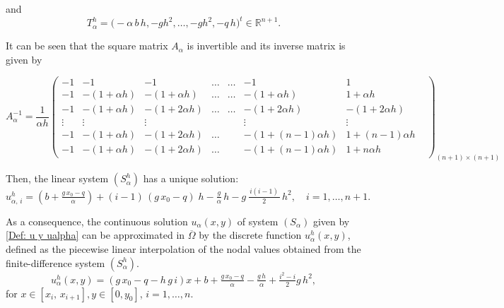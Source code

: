 \documentclass[11pt]{article}
\begin{document}
  \noindent and \begin{equation}\label{Talpha}
  {T^h_\alpha}= \Big(-\alpha\,b\,h, -g h^2, \ldots, -g h^2, -q\,h  \Big)^t \in  \mathbb{R}^{n+1}.
  \end{equation}
     
 \noindent It can be seen that the square matrix $A_{\alpha}$ is invertible  and its inverse matrix is given by
 
 
\begin{scriptsize}
\[A_{\alpha}^{-1}=\frac{1}{\alpha h}\begin{pmatrix}
-1 & -1 & -1 & \ldots & \ldots & -1 & 1 &\\                                                                                                   
-1 & -(1+\alpha h) & -(1+\alpha h) & \ldots & \ldots & -(1+\alpha h) & 1+\alpha h &\\                                                                                                   
-1 & -(1+\alpha h) & -(1+2\alpha h) & \ldots & \ldots &-(1+2\alpha h) & -(1+2\alpha h) &\\                                                                                                   
\vdots & \vdots & \vdots  &&& \vdots  & \vdots\\
-1& -(1+\alpha h)& -(1+2\alpha h) &\ldots && -(1+(n-1)\alpha h) & 1+(n-1)\alpha h\\
 -1 & -(1+\alpha h)& -(1+2\alpha h)& \ldots &  &-(1+(n-1)\alpha h) &1+n\alpha h
\end{pmatrix}_{(n+1)\times (n+1)}\] 
\end{scriptsize}
 
 
 
Then, the linear system ${(S^h_{\alpha})}$ has a unique solution:
\[ {u^h_{\alpha,\,i}} = (b + \tfrac{g\,x_0 - q}{\alpha}) + (i-1)  \,(g\,x_0-q)\; h - \tfrac{g}{\alpha}\,h  -   g \, \tfrac{\,i(i-1)\,}{2}\,h^2,\quad i=1, \ldots, n+1. \]
      
 {As a consequence, the continuous solution $u_{\alpha}(x, y)$ of system $(S_\alpha)$ given by \eqref{Def: u y ualpha} can be approximated in $\overline{\Omega}$ by the discrete function $u^h_{\alpha}(x, y)$, defined as the piecewise linear interpolation of the nodal values obtained from the finite-difference system $(S^h_{\alpha})$.
}
 \begin{equation}\label{ec 2.3}
     	   { u^h_{\alpha}} (x, y) = ( g\, x_0 - q - h\, g\, i) x + 
     	    b +  \tfrac{g\,x_0 - q}{\alpha} -  \tfrac{g\,h}{\alpha} +  \tfrac{i^2-i}{2} g\,h^2 ,
           \end{equation}
     	for $x \in [x_i, \,x_{i+1}], y\in [0, y_0]$, $i=1, \ldots , n.$
\end{document}
